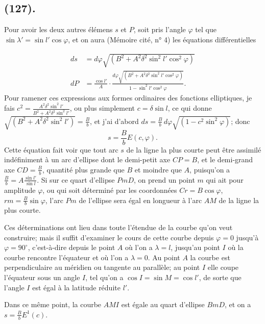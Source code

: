 \documentclass{article}
\begin{document}
\subsection*{(127).}

Pour avoir les deux autres élémens $s$ et $P$, soit pris l'angle $\varphi$ tel que $\sin\lambda'=\sin l'\cos\varphi$, et on aura (Mémoire cité, n° 4) les équations différentielles

\[ \begin{aligned} ds&=d\varphi\sqrt{(B^{2}+A^{2}\delta^{2}\sin^{2}l'\cos^{2}\varphi)}\\ dP&=\frac{\cos l'}{A}\cdot\frac{d\varphi\sqrt{(B^{2}+A^{2}\delta^{2}\sin^{2}l'\cos^{2}\varphi)}}{1-\sin^{2}l'\cos^{2}\varphi}. \end{aligned} \]
Pour ramener ces expressions aux formes ordinaires des fonctions elliptiques, je fais $c^{2}=\frac{A^{2}\delta^{2}\sin^{2}l'}{B^{2}+A^{2}\delta^{2}\sin^{2}l'}$, ou plus simplement $c=\delta\sin l$, ce qui donne $\sqrt{(B^{2}+A^{2}\delta^{2}\sin^{2}l')}=\frac{B}{b}$, et j'ai d'abord $ds=\frac{B}{b}\,d\varphi\sqrt{(1-c^{2}\sin^{2}\varphi)}$; donc
\[ s=\frac{B}{b}E(c,\varphi). \]
Cette équation fait voir que tout arc $s$ de la ligne la plus courte peut être assimilé indéfiniment à un arc d'ellipse dont le demi-petit axe $CP=B$, et le demi-grand axe $CD=\frac{B}{b}$, quantité plus grande que $B$ et moindre que $A$, puisqu'on a $\frac{B}{b}=A\frac{\sin l'}{\sin l}$. Si sur ce quart d'ellipse $PmD$, on prend un point $m$ qui ait pour amplitude $\varphi$, ou qui soit déterminé par les coordonnées $Cr=B\cos\varphi$, $rm=\frac{B}{b}\sin\varphi$, l'arc $Pm$ de l'ellipse sera égal en longueur à l'arc $AM$ de la ligne la plus courte.

Ces déterminations ont lieu dans toute l'étendue de la courbe qu'on veut construire; mais il suffit d'examiner le cours de cette courbe depuis $\varphi=0$ jusqu'à $\varphi=90^{\circ}$, c'est-à-dire depuis le point $A$ où l'on a $\lambda=l$, jusqu'au point $I$ où la courbe rencontre l'équateur et où l'on a $\lambda=0$. Au point $A$ la courbe est perpendiculaire au méridien ou tangente au parallèle; au point $I$ elle coupe l'équateur sous un angle $I$, tel qu'on a $\cos I=\sin M=\cos l'$, de sorte que l'angle $I$ est égal à la latitude réduite $l'$.

Dans ce même point, la courbe $AMI$ est égale au quart d'ellipse $BmD$, et on a $s=\frac{B}{b}E^{1}(c)$.
\end{document}
